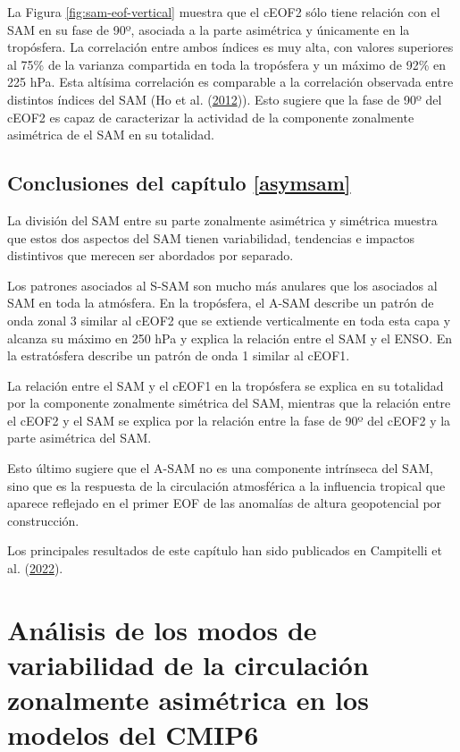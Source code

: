 \documentclass[12pt,oneside,a4paper]{reedthesis}
\begin{document}
La Figura \ref{fig:sam-eof-vertical} muestra que el cEOF2 sólo tiene relación con el SAM en su fase de 90º, asociada a la parte asimétrica y únicamente en la tropósfera.
La correlación entre ambos índices es muy alta, con valores superiores al 75\% de la varianza compartida en toda la tropósfera y un máximo de 92\% en 225 hPa.
Esta altísima correlación es comparable a la correlación observada entre distintos índices del SAM (Ho et al. (\protect\hyperlink{ref-ho2012}{2012})).
Esto sugiere que la fase de 90º del cEOF2 es capaz de caracterizar la actividad de la componente zonalmente asimétrica de el SAM en su totalidad.

\hypertarget{conclusiones-del-capuxedtulo-refasymsam}{%
\section{Conclusiones del capítulo \ref{asymsam}}\label{conclusiones-del-capuxedtulo-refasymsam}}

La división del SAM entre su parte zonalmente asimétrica y simétrica muestra que estos dos aspectos del SAM tienen variabilidad, tendencias e impactos distintivos que merecen ser abordados por separado.

Los patrones asociados al S-SAM son mucho más anulares que los asociados al SAM en toda la atmósfera.
En la tropósfera, el A-SAM describe un patrón de onda zonal 3 similar al cEOF2 que se extiende verticalmente en toda esta capa y alcanza su máximo en 250 hPa y explica la relación entre el SAM y el ENSO.
En la estratósfera describe un patrón de onda 1 similar al cEOF1.

La relación entre el SAM y el cEOF1 en la tropósfera se explica en su totalidad por la componente zonalmente simétrica del SAM, mientras que la relación entre el cEOF2 y el SAM se explica por la relación entre la fase de 90º del cEOF2 y la parte asimétrica del SAM.

Esto último sugiere que el A-SAM no es una componente intrínseca del SAM, sino que es la respuesta de la circulación atmosférica a la influencia tropical que aparece reflejado en el primer EOF de las anomalías de altura geopotencial por construcción.

Los principales resultados de este capítulo han sido publicados en Campitelli et al. (\protect\hyperlink{ref-campitelli2022}{2022}).

\hypertarget{cmip6}{%
\chapter{Análisis de los modos de variabilidad de la circulación zonalmente asimétrica en los modelos del CMIP6}\label{cmip6}}
\end{document}
